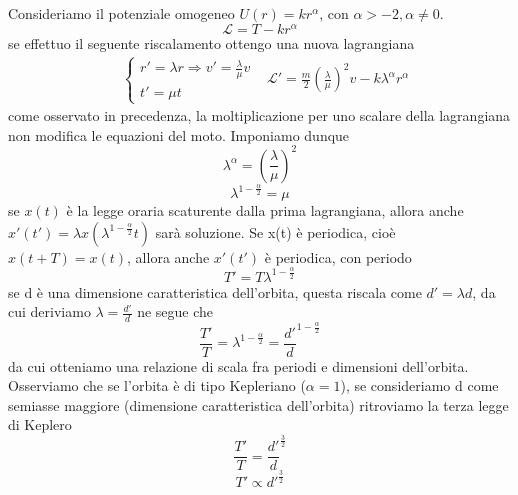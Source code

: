 \documentclass[
10pt, %
a4paper, %
oneside, %
headinclude,footinclude, %
BCOR5mm, %
]{scrartcl}
\begin{document}
\begin{enumerate}
\begin{osservazione}
		Consideriamo il potenziale omogeneo \(U(r) = kr^{\alpha}\), con $\alpha> -2, \alpha \neq 0$.
		\[\mathcal{L} = T-kr^{\alpha}\]
		se effettuo il seguente riscalamento ottengo una nuova lagrangiana
		\begin{align*}
			&\begin{cases}
				r' = \lambda r\Rightarrow v' = \frac{\lambda}{\mu}v\\
				t'= \mu t
			\end{cases}
			&\mathcal{L}' = \frac{m}{2}\left(\frac{\lambda}{\mu}\right)^2v-k\lambda^{\alpha} r^{\alpha}
		\end{align*}
		come osservato in precedenza, la moltiplicazione per uno scalare della lagrangiana non modifica le equazioni del moto. Imponiamo dunque
		\[\lambda^{\alpha} = \left(\frac{\lambda}{\mu}\right)^2\]
		\[\lambda^{1-\frac{\alpha}{2}} = \mu\]
		se \(x(t)\) è la legge oraria scaturente dalla prima lagrangiana, allora anche \(x'(t') = \lambda x (\lambda^{1-\frac{\alpha}{2}} t)\) sarà soluzione. Se x(t) è periodica, cioè \(x(t+T) = x(t)\), allora anche \(x'(t')\) è periodica, con periodo
		\[T' = T\lambda^{1-\frac{\alpha}{2}}\]
		se d è una dimensione caratteristica dell'orbita, questa riscala come \(d' = \lambda d\), da cui deriviamo \(\lambda= \frac{d'}{d}\) ne segue che
		\[\frac{T'}{T} = \lambda^{1-\frac{\alpha}{2}} = \frac{d'}{d}^{1-\frac{\alpha}{2}}\]
		da cui otteniamo una relazione di scala fra periodi e dimensioni dell'orbita. Osserviamo che se l'orbita è di tipo Kepleriano (\(\alpha  = 1\)), se consideriamo d come semiasse maggiore (dimensione caratteristica dell'orbita) ritroviamo la terza legge di Keplero
		\[\frac{T'}{T} =  \frac{d'}{d}^{\frac{3}{2}}\]
		\[T'\propto d'^{\frac{3}{2}} \]
	\end{osservazione}
\end{enumerate}
\end{document}
